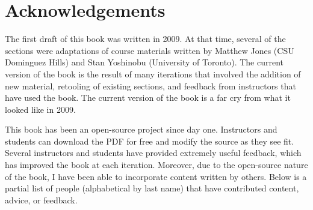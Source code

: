 \chapter*{Acknowledgements}

The first draft of this book was written in 2009. At that time, several of the sections were adaptations of course materials written by Matthew Jones (CSU Dominguez Hills) and Stan Yoshinobu (University of Toronto). The current version of the book is the result of many iterations that involved the addition of new material, retooling of existing sections, and feedback from instructors that have used the book. The current version of the book is a far cry from what it looked like in 2009.

This book has been an open-source project since day one. Instructors and students can download the PDF for free and modify the source as they see fit. Several instructors and students have provided extremely useful feedback, which has improved the book at each iteration. Moreover, due to the open-source nature of the book, I have been able to incorporate content written by others. Below is a partial list of people (alphabetical by last name) that have contributed content, advice, or feedback.

